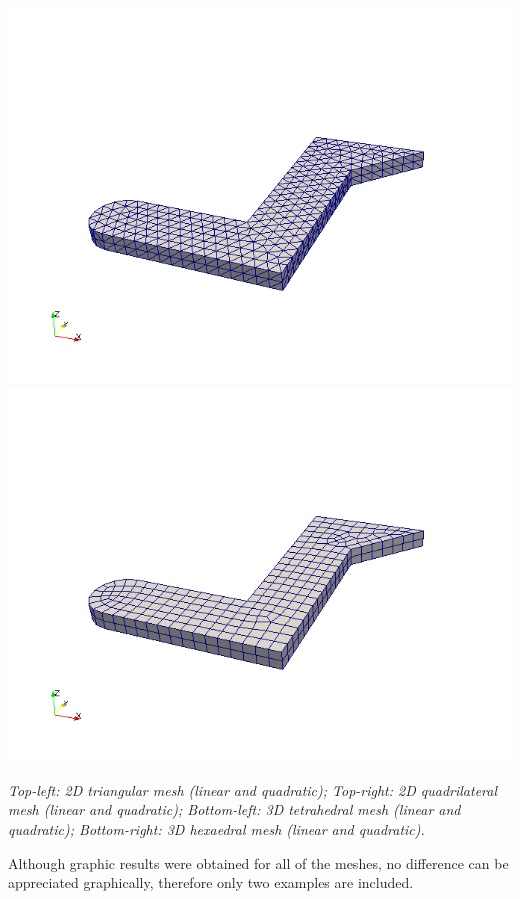 \documentclass[paper=a4, fontsize=11pt]{article} %
\numberwithin{equation}{section} %
\numberwithin{figure}{section} %
\numberwithin{table}{section} %
\begin{document}
\begin{center}
\includegraphics[scale=0.3]{mesh_tet}\includegraphics[scale=0.3]{mesh_hexa}

\textit{Top-left: 2D triangular mesh (linear and quadratic); Top-right: 2D quadrilateral mesh (linear and quadratic); Bottom-left: 3D tetrahedral mesh (linear and quadratic); Bottom-right: 3D hexaedral mesh (linear and quadratic).}
\end{center}

Although graphic results were obtained for all of the meshes, no difference can be appreciated graphically, therefore only two examples are included. 
\end{document}
